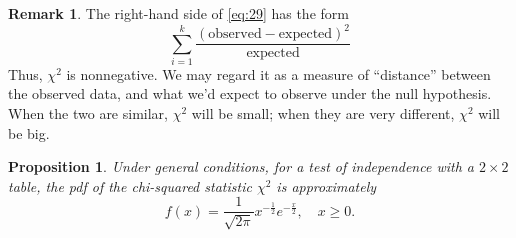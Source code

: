 \documentclass[10pt]{article}
\newtheorem{proposition}[theorem]{Proposition}
\theoremstyle{definition}
\newtheorem{remark}[theorem]{Remark}
\newcommand{\1}[1]{\textbf{1}_{\left[#1\right]}} %
\begin{document}
  \begin{remark}
    The right-hand side of \cref{eq:29} has the form
    \begin{equation*}
      \sum_{i=1}^{k} \frac{\left( \text{observed}- \text{expected} \right)^{2} }{ \text{expected}} 
    \end{equation*}
    Thus, $\chi^{2}$ is nonnegative. We may regard it as a measure of
    ``distance'' between the observed data, and what we'd expect to observe
    under the null hypothesis. When the two are similar, $\chi^{2}$ will be
    small; when they are very different, $\chi^{2}$ will be big.
  \end{remark}
  
  \begin{proposition}
    \label{prop:chi-squared-theorem}
    Under general conditions, for a test of independence with a $2\times 2$
    table, the pdf of the chi-squared statistic $\chi^{2}$ is approximately
    \begin{equation*}
      f(x) = \frac{1}{\sqrt{2\pi}}x^{-\frac{1}{2}}e^{-\frac{x}{2}}, \quad x \geq 0.
    \end{equation*}
  \end{proposition}
\end{document}
